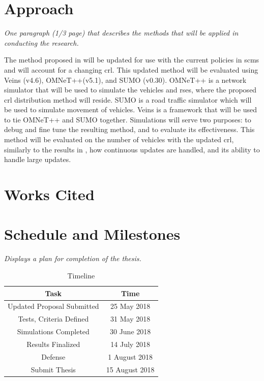 \documentclass {article}
\newcommand{\sechint}[1]{\small{\emph{#1}} \bigskip}
\begin{document}
\section{Approach}{\sechint{One paragraph (1/3 page) that describes the methods that will be applied in conducting the research.}}

The method proposed in \autocite{haas_efficient_2011} will be updated for use with the current policies in \gls{scms} and will account for a changing \gls{crl}. This updated method will be evaluated using Veins (v4.6), OMNeT++(v5.1), and SUMO (v0.30). OMNeT++ is a network simulator that will be used to simulate the vehicles and \gls{rse}s, where the proposed \gls{crl} distribution method will reside. SUMO is a road traffic simulator which will be used to simulate movement of vehicles. Veins is a framework that will be used to tie OMNeT++ and SUMO together. Simulations will serve two purposes: to debug and fine tune the resulting method, and to evaluate its effectiveness. This method will be evaluated on the number of vehicles with the updated \gls{crl}, similarly to the results in \autocite{haas_efficient_2011}, how continuous updates are handled, and its ability to handle large updates.

\pagebreak
\section{Works Cited}
\printbibliography[title={\ }]

\pagebreak
\section{Schedule and Milestones}{\sechint{Displays a plan for completion of the thesis.}}

\begin{table}[!ht]
	\centering
	\begin{tabular}{c|c}
		\hline
		Task & Time \\ \hline \hline
		Updated Proposal Submitted & 25 May 2018 \\ \hline
		Tests, Criteria Defined & 31 May 2018 \\ \hline
		Simulations Completed & 30 June 2018 \\ \hline
		Results Finalized & 14 July 2018 \\ \hline
		Defense & 1 August 2018 \\ \hline
		Submit Thesis & 15 August 2018 \\ \hline
	\end{tabular}
	\caption{Timeline}
\end{table}
\end{document}
